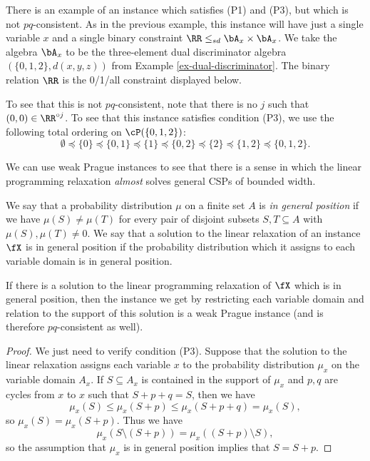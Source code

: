 \begin{ex} There is an example of an instance which satisfies (P1) and (P3), but which is not $pq$-consistent. As in the previous example, this instance will have just a single variable $x$ and a single binary constraint $\RR \le_{sd} \bA_x \times \bA_x$. We take the algebra $\bA_x$ to be the three-element dual discriminator algebra $(\{0,1,2\},d(x,y,z))$ from Example \ref{ex-dual-discriminator}. The binary relation $\RR$ is the 0/1/all constraint displayed below.
\begin{center}
\end{center}

To see that this is not $pq$-consistent, note that there is no $j$ such that $(0,0) \in \RR^{\circ j}$. To see that this instance satisfies condition (P3), we use the following total ordering on $\cP(\{0,1,2\})$:
\[
\emptyset \preceq \{0\} \preceq \{0,1\} \preceq \{1\} \preceq \{0,2\} \preceq \{2\} \preceq \{1,2\} \preceq \{0,1,2\}.
\]
\end{ex}

We can use weak Prague instances to see that there is a sense in which the linear programming relaxation \emph{almost} solves general CSPs of bounded width.

\begin{defn} We say that a probability distribution $\mu$ on a finite set $A$ is \emph{in general position} if we have $\mu(S) \ne \mu(T)$ for every pair of disjoint subsets $S,T \subseteq A$ with $\mu(S), \mu(T) \ne 0$. We say that a solution to the linear relaxation of an instance $\fX$ is in general position if the probability distribution which it assigns to each variable domain is in general position.
\end{defn}

\begin{prop} If there is a solution to the linear programming relaxation of $\fX$ which is in general position, then the instance we get by restricting each variable domain and relation to the support of this solution is a weak Prague instance (and is therefore $pq$-consistent as well).
\end{prop}
\begin{proof} We just need to verify condition (P3). Suppose that the solution to the linear relaxation assigns each variable $x$ to the probability distribution $\mu_x$ on the variable domain $A_x$. If $S \subseteq A_x$ is contained in the support of $\mu_x$ and $p,q$ are cycles from $x$ to $x$ such that $S + p + q = S$, then we have
\[
\mu_x(S) \le \mu_x(S+p) \le \mu_x(S+p+q) = \mu_x(S),
\]
so $\mu_x(S) = \mu_x(S+p)$. Thus we have
\[
\mu_x(S \setminus (S+p)) = \mu_x((S+p) \setminus S),
\]
so the assumption that $\mu_x$ is in general position implies that $S = S+p$.
\end{proof}

